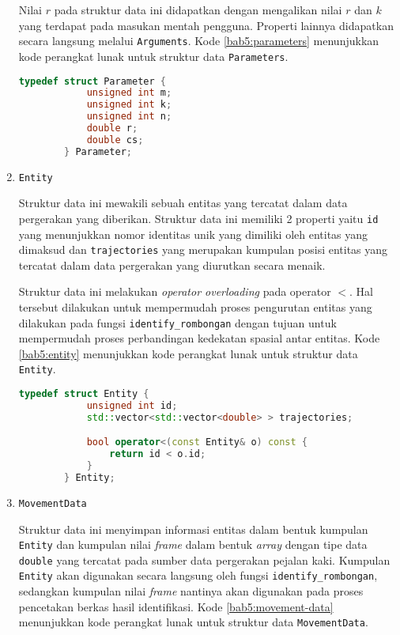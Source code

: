 \begin{enumerate}
    Nilai $r$ pada struktur data ini didapatkan dengan mengalikan nilai $r$ dan $k$ yang terdapat pada masukan mentah pengguna. Properti lainnya didapatkan secara langsung melalui \texttt{Arguments}. Kode \ref{bab5:parameters} menunjukkan kode perangkat lunak untuk struktur data \texttt{Parameters}.
    
    \begin{lstlisting}[language=C++, caption=Implementasi \texttt{Parameters}, label={bab5:parameters}]
        typedef struct Parameter {
            unsigned int m;
            unsigned int k;
            unsigned int n;
            double r;
            double cs;
        } Parameter;
    \end{lstlisting}
    
    \item \texttt{Entity}
    
    Struktur data ini mewakili sebuah entitas yang tercatat dalam data pergerakan yang diberikan. Struktur data ini memiliki 2 properti yaitu \texttt{id} yang menunjukkan nomor identitas unik yang dimiliki oleh entitas yang dimaksud dan \texttt{trajectories} yang merupakan kumpulan posisi entitas yang tercatat dalam data pergerakan yang diurutkan secara menaik.
    
    Struktur data ini melakukan \textit{operator overloading} pada operator $<$. Hal tersebut dilakukan untuk mempermudah proses pengurutan entitas yang dilakukan pada fungsi \texttt{identify\_rombongan} dengan tujuan untuk mempermudah proses perbandingan kedekatan spasial antar entitas. Kode \ref{bab5:entity} menunjukkan kode perangkat lunak untuk struktur data \texttt{Entity}.
    
    \begin{lstlisting}[language=C++, caption=Implementasi \texttt{Entity}, label={bab5:entity}]
        typedef struct Entity {
            unsigned int id;
            std::vector<std::vector<double> > trajectories;

            bool operator<(const Entity& o) const {
                return id < o.id;
            }
        } Entity;
    \end{lstlisting}
    
    \item \texttt{MovementData}
    
    Struktur data ini menyimpan informasi entitas dalam bentuk kumpulan \texttt{Entity} dan kumpulan nilai \textit{frame} dalam bentuk \textit{array} dengan tipe data \texttt{double} yang tercatat pada sumber data pergerakan pejalan kaki. Kumpulan \texttt{Entity} akan digunakan secara langsung oleh fungsi \texttt{identify\_rombongan}, sedangkan kumpulan nilai \textit{frame} nantinya akan digunakan pada proses pencetakan berkas hasil identifikasi. Kode \ref{bab5:movement-data} menunjukkan kode perangkat lunak untuk struktur data \texttt{MovementData}.
    

\end{enumerate}
